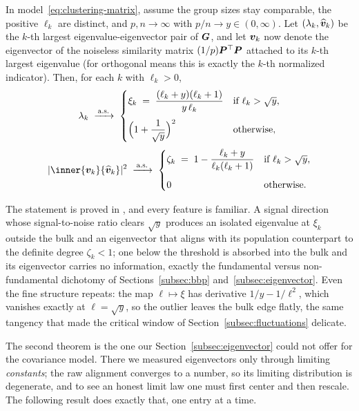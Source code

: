 \begin{theorem}\label{thm:gram-spikes}
In model~\eqref{eq:clustering-matrix}, assume the group sizes stay comparable, the positive \(\ell_k\) are distinct, and \(p, n \to \infty\) with \(p/n \to y \in (0, \infty)\). Let \((\lambda_k, \widehat{\bm{v}}_k)\) be the \(k\)-th largest eigenvalue-eigenvector pair of \(\bm{G}\), and let \(\bm{v}_k\) now denote the eigenvector of the noiseless similarity matrix \((1/p)\bm{P}^{\top}\bm{P}\) attached to its \(k\)-th largest eigenvalue (for orthogonal means this is exactly the \(k\)-th normalized indicator). Then, for each \(k\) with \(\ell_k > 0\),
\[
  \lambda_k \;\xrightarrow{\,\text{a.s.}\,}\;
  \begin{cases}
    \xi_k \;=\; \dfrac{(\ell_k + y)(\ell_k + 1)}{y\, \ell_k} & \text{if } \ell_k > \sqrt{y}, \\[1.2em]
    \Bigl(1 + \dfrac{1}{\sqrt{y}}\Bigr)^{2} & \text{otherwise},
  \end{cases}
  \]
  \[
  \abs{\inner{\vect{v}_k}{\widehat{\vect{v}}_k}}^2 \;\convas\;
  \begin{cases}
    \zeta_k \;=\; 1 - \dfrac{\ell_k + y}{\ell_k (\ell_k + 1)} & \text{if } \ell_k > \sqrt{y}, \\[1.2em]
    0 & \text{otherwise}.
  \end{cases}
\]
\end{theorem}

The statement is proved in \citet[][Thm.~2]{CouilletChatelainLeBihan2021}, and every feature is familiar. A signal direction whose signal-to-noise ratio clears \(\sqrt{y}\) produces an isolated eigenvalue at \(\xi_k\) outside the bulk and an eigenvector that aligns with its population counterpart to the definite degree \(\zeta_k < 1\); one below the threshold is absorbed into the bulk and its eigenvector carries no information, exactly the fundamental versus non-fundamental dichotomy of Sections~\ref{subsec:bbp} and~\ref{subsec:eigenvector}. Even the fine structure repeats: the map \(\ell \mapsto \xi\) has derivative \(1/y - 1/\ell^2\), which vanishes exactly at \(\ell = \sqrt{y}\), so the outlier leaves the bulk edge flatly, the same tangency that made the critical window of Section~\ref{subsec:fluctuations} delicate.

The second theorem is the one our Section~\ref{subsec:eigenvector} could not offer for the covariance model. There we measured eigenvectors only through limiting \emph{constants}; the raw alignment converges to a number, so its limiting distribution is degenerate, and to see an honest limit law one must first center and then rescale. The following result does exactly that, one entry at a time.

